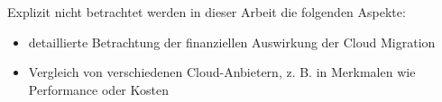 Explizit nicht betrachtet werden in dieser Arbeit die folgenden Aspekte:
\begin{itemize}
\item detaillierte Betrachtung der finanziellen Auswirkung der Cloud Migration
\item Vergleich von verschiedenen Cloud-Anbietern, z. B. in Merkmalen wie Performance oder Kosten
\end{itemize}

\pagebreak



